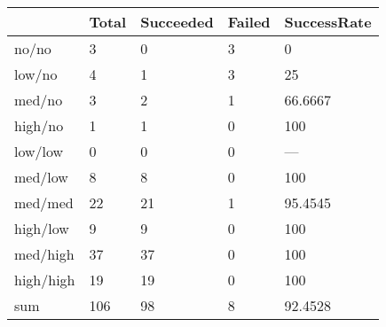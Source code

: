 \begin{tabular}{lllll}
& Total & Succeeded & Failed & SuccessRate \\ 
\hline 
no/no & 3 & 0 & 3 & 0 \\ 
low/no & 4 & 1 & 3 & 25 \\ 
med/no & 3 & 2 & 1 & 66.6667 \\ 
high/no & 1 & 1 & 0 & 100 \\ 
low/low & 0 & 0 & 0 & --- \\ 
med/low & 8 & 8 & 0 & 100 \\ 
med/med & 22 & 21 & 1 & 95.4545 \\ 
high/low & 9 & 9 & 0 & 100 \\ 
med/high & 37 & 37 & 0 & 100 \\ 
high/high & 19 & 19 & 0 & 100 \\ 
sum & 106 & 98 & 8 & 92.4528 \\ 
\hline 
\end{tabular}